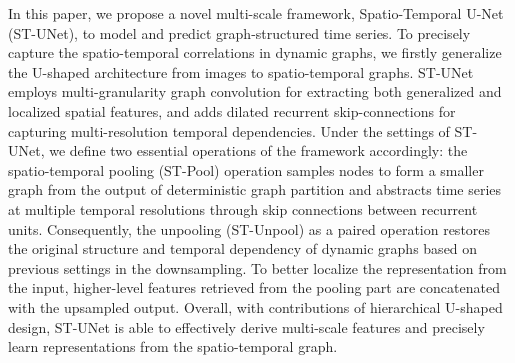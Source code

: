 \documentclass[sigconf,screen]{acmart}
\begin{document}
In this paper, we propose a novel multi-scale framework, Spatio-Temporal U-Net (ST-UNet), to model and predict graph-structured time series. To precisely capture the spatio-temporal correlations in dynamic graphs, we firstly generalize the U-shaped architecture from images to spatio-temporal graphs. ST-UNet employs multi-granularity graph convolution for extracting both generalized and localized spatial features, and adds dilated recurrent skip-connections for capturing multi-resolution temporal dependencies. Under the settings of ST-UNet, we define two essential operations of the framework accordingly: the spatio-temporal pooling (ST-Pool) operation samples nodes to form a smaller graph from the output of deterministic graph partition \cite{maue2007engineering} and abstracts time series at multiple temporal resolutions through skip connections between recurrent units. Consequently, the unpooling (ST-Unpool) as a paired operation restores the original structure and temporal dependency of dynamic graphs based on previous settings in the downsampling. To better localize the representation from the input, higher-level features retrieved from the pooling part are concatenated with the upsampled output. Overall, with contributions of hierarchical U-shaped design, ST-UNet is able to effectively derive multi-scale features and precisely learn representations from the spatio-temporal graph.
\end{document}
